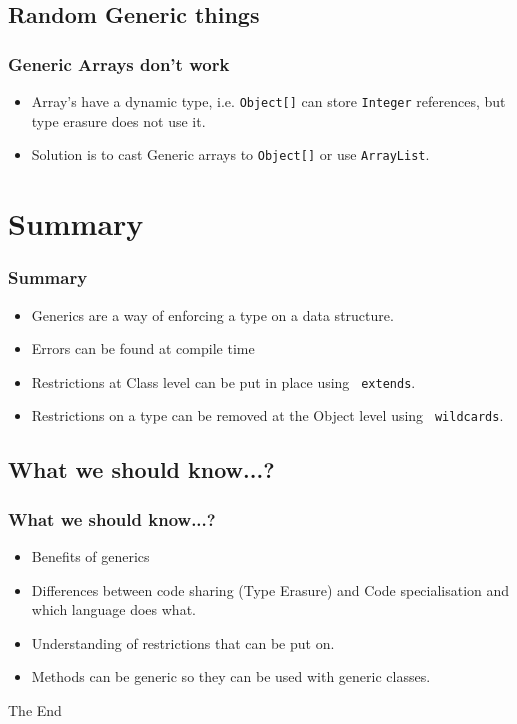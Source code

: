 \documentclass{beamer}
\begin{document}
\subsection{Random Generic things}
\begin{frame}
\frametitle{Generic Arrays don't work}
\begin{itemize}
\item Array's have a dynamic type, i.e. \texttt{Object[]} can store \texttt{Integer} references, but {\color{red} type erasure} does not use it.
\item Solution is to cast Generic arrays to \texttt{Object[]} or use \texttt{ArrayList}.
\end{itemize}
\end{frame}
\section{Summary}
\begin{frame}
\frametitle{Summary}
\begin{itemize}
\item Generics are a way of enforcing a type on a data structure.
\item Errors can be found at {\color{green} compile time}
\item Restrictions at {\color{purple} Class level} can be put in place using \texttt{\color{blue} extends}.
\item Restrictions on a type can be removed at the {\color{orange} Object level} using \texttt{\color{red} wildcards}.
\end{itemize}
\end{frame}
\subsection{What we should know...?}
\begin{frame}
\frametitle{What we should know...?}
\begin{itemize}
\item Benefits of generics
\item Differences between {\color{green} code sharing (Type Erasure)} and {\color{red}Code specialisation} and which language does what.
\item Understanding of restrictions that can be put on.
\item Methods can be generic so they can be used with generic classes.
\end{itemize}
\end{frame}
\begin{frame}
\Huge{\centerline{The End}}
\end{frame}

\end{document}
